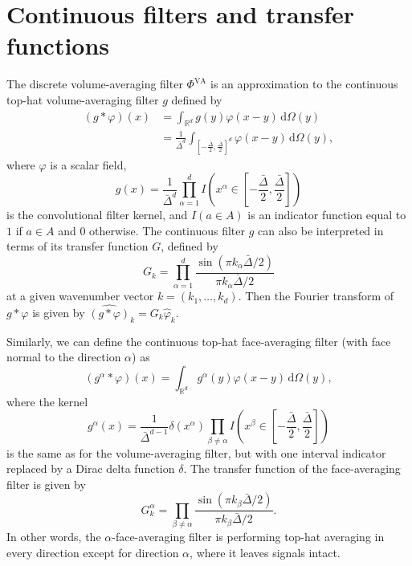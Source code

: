 \documentclass[preprint]{elsarticle}
\newcommand{\revtwo}[1]{#1}
\begin{document}
\section{Continuous filters and transfer functions} \label{sec:continuous_filtering}

The discrete volume-averaging filter $\Phi^\text{VA}$ is an
approximation to the continuous top-hat volume-averaging filter $g$ defined by
\begin{equation}
    \begin{split}
        (g * \varphi)(x)
        & = \int_{\mathbb{R}^d} g(y) \varphi(x - y) \, \mathrm{d} \Omega(y) \\
        & = \frac{1}{\bar{\Delta}^d}
        \int_{\left[ -\frac{\bar{\Delta}}{2}, \frac{\bar{\Delta}}{2} \right]^d}
        \varphi(x - y) \, \mathrm{d} \Omega(y),
    \end{split}
\end{equation}
where $\varphi$ is a scalar field,
\begin{equation*}
    g(x) = \frac{1}{\bar{\Delta}^d}
        \prod_{\alpha = 1}^d
        I \left(x^\alpha \in
        \left[ -\frac{\bar{\Delta}}{2}, \frac{\bar{\Delta}}{2} \right]
        \right)
\end{equation*}
is the convolutional filter kernel, and $I(a \in A)$ is an indicator function equal
to $1$ if $a \in A$ and $0$ otherwise.
The continuous filter $g$ can also be interpreted in terms of its transfer
function $G$, defined by
\begin{equation}
    G_k = \prod_{\alpha = 1}^d \frac{\sin(\pi k_\alpha \bar{\Delta} /
    2)}{\pi k_\alpha \bar{\Delta} / 2}
\end{equation}
at a given wavenumber vector $k = (k_1, \dots, k_d)$.
Then the Fourier transform of $g * \varphi$ is given by
$\widehat{(g * \varphi)}_k = G_k \hat{\varphi}_k$.

Similarly, we can define the continuous top-hat face-averaging filter (with face normal
to the direction $\alpha$) as
\begin{equation}
    (g^\alpha * \varphi)(x) = \int_{\mathbb{R}^d} g^\alpha(y) \varphi(x - y) \,
    \mathrm{d} \Omega(y),
\end{equation}
where the kernel
\begin{equation}
    g^\alpha(x) = \frac{1}{\bar{\Delta}^{d - 1}} \delta(x^\alpha)
    \prod_{\beta \neq \alpha}
    I \left(x^\beta \in
    \left[ -\frac{\bar{\Delta}}{2}, \frac{\bar{\Delta}}{2} \right]
    \right)
\end{equation}
is the same as for the volume-averaging filter, but with one interval indicator
replaced by a Dirac delta function $\delta$.
The transfer function of the face-averaging filter is given by
\begin{equation}
    G^\alpha_k = \prod_{\beta \neq \alpha} \frac{\sin(\pi k_\beta \bar{\Delta} / 2)}{\pi k_\beta \bar{\Delta} / 2}.
\end{equation}
In other words, the $\alpha$-face-averaging filter is performing top-hat averaging
in every direction except for direction $\alpha$, where it leaves signals intact.
\end{document}
